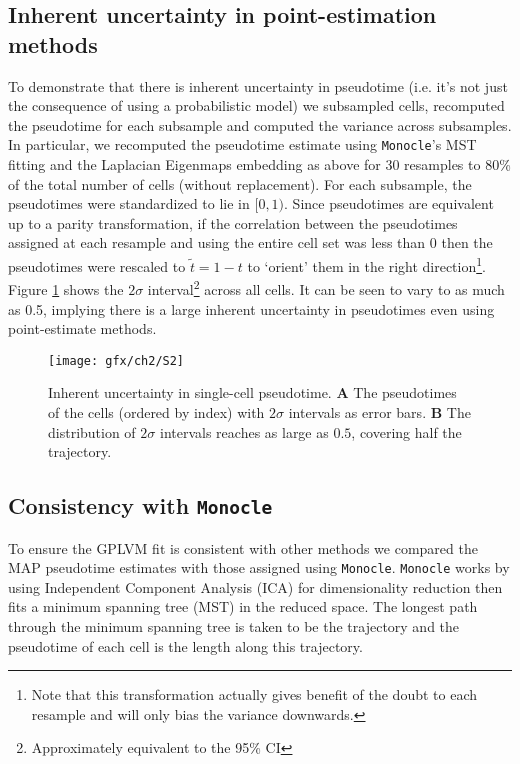 \subsection{Inherent uncertainty in point-estimation methods} \label{sec:inherentuncert}

To demonstrate that there is inherent uncertainty in pseudotime (i.e. it's not just the consequence of using a probabilistic model) we subsampled cells, recomputed the pseudotime for each subsample and computed the variance across subsamples. In particular, we recomputed the pseudotime estimate using \texttt{Monocle}'s MST fitting and the Laplacian Eigenmaps embedding as above for 30 resamples to 80\% of the total number of cells (without replacement). For each subsample, the pseudotimes were standardized to lie in $[0,1)$. Since pseudotimes are equivalent up to a parity transformation, if the correlation between the pseudotimes assigned at each resample and using the entire cell set was less than 0 then the pseudotimes were rescaled to $\tilde{t} = 1-t$ to `orient' them in the right direction\footnote{Note that this transformation actually gives benefit of the doubt to each resample and will only bias the variance downwards.}. Figure \ref{fig:s2} shows the $2\sigma$ interval\footnote{Approximately equivalent to the 95\% CI} across all cells. It can be seen to vary to as much as 0.5, implying there is a large inherent uncertainty in pseudotimes even using point-estimate methods.

\begin{figure}
\centering
	\texttt{[image: gfx/ch2/S2]}
\caption{Inherent uncertainty in single-cell pseudotime. \textbf{A} The pseudotimes of the cells (ordered by index) with $2 \sigma$ intervals as error bars. \textbf{B} The distribution of $2\sigma$ intervals reaches as large as $0.5$, covering half the trajectory.} \label{fig:s2}
\end{figure}

\subsection{Consistency with \texttt{Monocle}}
To ensure the GPLVM fit is consistent with other methods we compared the MAP pseudotime estimates with those assigned using \texttt{Monocle}. \texttt{Monocle} works by using Independent Component Analysis (ICA) for dimensionality reduction then fits a minimum spanning tree (MST) in the reduced space. The longest path through the minimum spanning tree is taken to be the trajectory and the pseudotime of each cell is the length along this trajectory.

